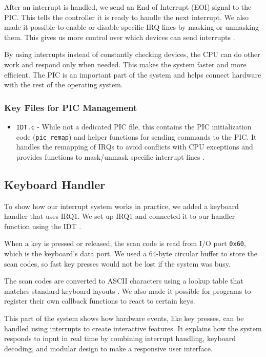 \documentclass[a4paper,11pt]{article}
\begin{document}
After an interrupt is handled, we send an End of Interrupt (EOI) signal to the PIC. This tells the controller it is ready to handle the next interrupt. We also made it possible to enable or disable specific IRQ lines by masking or unmasking them. This gives us more control over which devices can send interrupts \cite{OSDev_PIC} \cite{OSDev_Interrupts}.

By using interrupts instead of constantly checking devices, the CPU can do other work and respond only when needed. This makes the system faster and more efficient. The PIC is an important part of the system and helps connect hardware with the rest of the operating system.


\subsubsection{Key Files for PIC Management}
\begin{itemize}
    \item \texttt{IDT.c} - While not a dedicated PIC file, this contains the PIC initialization code (\texttt{pic\_remap}) and helper functions for sending commands to the PIC. It handles the remapping of IRQs to avoid conflicts with CPU exceptions and provides functions to mask/unmask specific interrupt lines \cite{OSDev_PIC} \cite{OSDev_Interrupts}.
\end{itemize}

\subsection{Keyboard Handler}

To show how our interrupt system works in practice, we added a keyboard handler that uses IRQ1. We set up IRQ1 and connected it to our handler function using the IDT \cite{OSDev_Keyboard} \cite{OSDev_Interrupts}.

When a key is pressed or released, the scan code is read from I/O port \texttt{0x60}, which is the keyboard’s data port. We used a 64-byte circular buffer to store the scan codes, so fast key presses would not be lost if the system was busy.

The scan codes are converted to ASCII characters using a lookup table that matches standard keyboard layouts \cite{ASCII}. We also made it possible for programs to register their own callback functions to react to certain keys.

This part of the system shows how hardware events, like key presses, can be handled using interrupts to create interactive features. It explains how the system responds to input in real time by combining interrupt handling, keyboard decoding, and modular design to make a responsive user interface.
\end{document}
